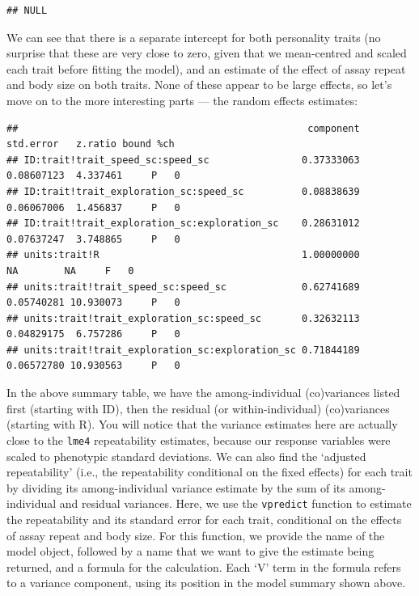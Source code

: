 \documentclass[
  12pt,
]{book}
\newenvironment{Shaded}{\begin{snugshade}}{\end{snugshade}}
\newcommand{\AttributeTok}[1]{\textcolor[rgb]{0.77,0.63,0.00}{#1}}
\newcommand{\ConstantTok}[1]{\textcolor[rgb]{0.00,0.00,0.00}{#1}}
\newcommand{\FunctionTok}[1]{\textcolor[rgb]{0.00,0.00,0.00}{#1}}
\newcommand{\NormalTok}[1]{#1}
\newcommand{\SpecialCharTok}[1]{\textcolor[rgb]{0.00,0.00,0.00}{#1}}
\begin{document}
\begin{Shaded}
\end{Shaded}

\begin{verbatim}
## NULL
\end{verbatim}

We can see that there is a separate intercept for both personality traits (no surprise that these are very close to zero, given that we mean-centred and scaled each trait before fitting the model), and an estimate of the effect of assay repeat and body size on both traits. None of these appear to be large effects, so let's move on to the more interesting parts --- the random effects estimates:

\begin{Shaded}
\end{Shaded}

\begin{verbatim}
##                                                  component  std.error   z.ratio bound %ch
## ID:trait!trait_speed_sc:speed_sc                0.37333063 0.08607123  4.337461     P   0
## ID:trait!trait_exploration_sc:speed_sc          0.08838639 0.06067006  1.456837     P   0
## ID:trait!trait_exploration_sc:exploration_sc    0.28631012 0.07637247  3.748865     P   0
## units:trait!R                                   1.00000000         NA        NA     F   0
## units:trait!trait_speed_sc:speed_sc             0.62741689 0.05740281 10.930073     P   0
## units:trait!trait_exploration_sc:speed_sc       0.32632113 0.04829175  6.757286     P   0
## units:trait!trait_exploration_sc:exploration_sc 0.71844189 0.06572780 10.930563     P   0
\end{verbatim}

In the above summary table, we have the among-individual (co)variances listed first (starting with ID), then the residual (or within-individual) (co)variances (starting with R). You will notice that the variance estimates here are actually close to the \texttt{lme4} repeatability estimates, because our response variables were scaled to phenotypic standard deviations. We can also find the `adjusted repeatability' (i.e., the repeatability conditional on the fixed effects) for each trait by dividing its among-individual variance estimate by the sum
of its among-individual and residual variances.
Here, we use the \texttt{vpredict} function to estimate the repeatability and its
standard error for each trait, conditional on the effects of assay repeat and body size.
For this function, we provide the name of the model object, followed by a name that we want to give the estimate being returned, and a formula for the calculation. Each `V' term in the formula refers to a variance component, using its position in the model summary shown above.
\end{document}
